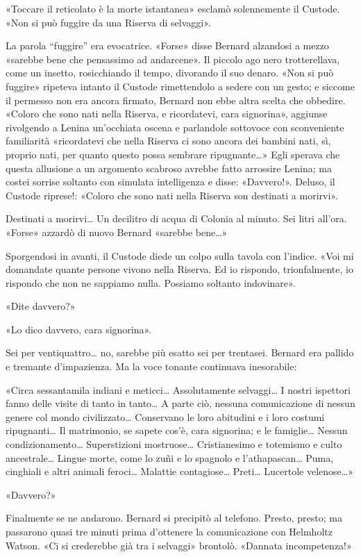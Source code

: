 \documentclass[
a5paper, %
10pt, %
twoside, 
onecolumn, %
openany, %
]{memoir}
\begin{document}
«Toccare il reticolato è la morte istantanea» esclamò solennemente il Custode. «Non si può fuggire da una Riserva di selvaggi».

La parola “fuggire” era evocatrice. «Forse» disse Bernard alzandosi a mezzo «sarebbe bene che pensassimo ad andarcene». Il piccolo ago nero trotterellava, come un insetto, rosicchiando il tempo, divorando il suo denaro. «Non si può fuggire» ripeteva intanto il Custode rimettendolo a sedere con un gesto; e siccome il permesso non era ancora firmato, Bernard non ebbe altra scelta che obbedire. «Coloro che sono nati nella Riserva, e ricordatevi, cara signorina», aggiunse rivolgendo a Lenina un’occhiata oscena e parlandole sottovoce con sconveniente familiarità «ricordatevi che nella Riserva ci sono ancora dei bambini nati, sì, proprio nati, per quanto questo possa sembrare ripugnante…» Egli sperava che questa allusione a un argomento scabroso avrebbe fatto arrossire Lenina; ma costei sorrise soltanto con simulata intelligenza e disse: «Davvero!». Deluso, il Custode riprese!: «Coloro che sono nati nella Riserva son destinati a morirvi».

Destinati a morirvi… Un decilitro di acqua di Colonia al minuto. Sei litri all’ora. «Forse» azzardò di nuovo Bernard «sarebbe bene…»

Sporgendosi in avanti, il Custode diede un colpo sulla tavola con l’indice. «Voi mi domandate quante persone vivono nella Riserva. Ed io rispondo, trionfalmente, io rispondo che non ne sappiamo nulla. Possiamo soltanto indovinare».

«Dite davvero?»

«Lo dico davvero, cara signorina».

Sei per ventiquattro… no, sarebbe più esatto sei per trentasei. Bernard era pallido e tremante d’impazienza. Ma la voce tonante continuava inesorabile:

«Circa sessantamila indiani e meticci… Assolutamente selvaggi… I nostri ispettori fanno delle visite di tanto in tanto… A parte ciò, nessuna comunicazione di nessun genere col mondo civilizzato… Conservano le loro abitudini e i loro costumi ripugnanti… Il matrimonio, se sapete cos’è, cara signorina; e le famiglie… Nessun condizionamento… Superstizioni mostruose… Cristianesimo e totemismo e culto ancestrale… Lingue morte, come lo zuñi e lo spagnolo e l’athapascan… Puma, cinghiali e altri animali feroci… Malattie contagiose… Preti… Lucertole velenose…»

«Davvero?»

Finalmente se ne andarono. Bernard si precipitò al telefono. Presto, presto; ma passarono quasi tre minuti prima d’ottenere la comunicazione con Helmholtz Watson. «Ci si crederebbe già tra i selvaggi» brontolò. «Dannata incompetenza!»
\end{document}
